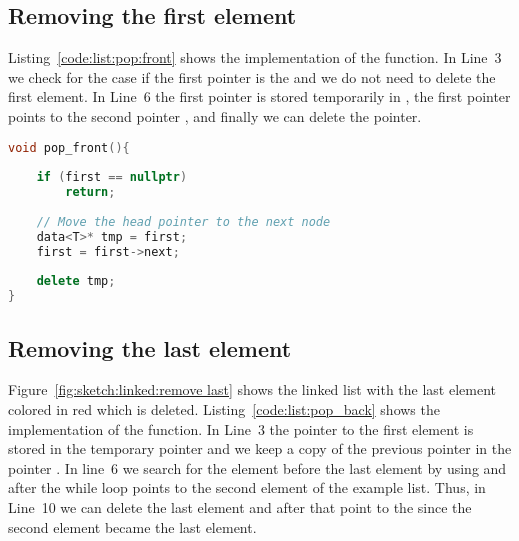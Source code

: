 \subsection*{Removing the first element}


Listing~\ref{code:list:pop:front} shows the implementation of the  function. In Line~3 we check for the case if the first pointer is the  and we do not need to delete the first element. In Line~6 the first pointer is stored temporarily in , the first pointer points to the second pointer , and finally we can delete the  pointer.


\begin{lstlisting}[language=c++,caption={Implementation of the \cpp{pop_front} function of a linked list.\label{code:list:pop:front}},float,floatplacement=tb]
void pop_front(){
    
    if (first == nullptr) 
        return; 
  
    // Move the head pointer to the next node 
    data<T>* tmp = first; 
    first = first->next; 
  
    delete tmp;   
}
\end{lstlisting}


\subsection*{Removing the last element}
Figure~\ref{fig:sketch:linked:remove last} shows the linked list with the last element colored in \textcolor{amaranth}{red} which is deleted. Listing~\ref{code:list:pop_back} shows the implementation of the  function. In Line~3 the pointer to the first element is stored in the temporary pointer  and we keep a copy of the previous pointer in the pointer . In line~6 we search for the element before the last element by using  and after the while loop  points to the second element of the example list.  Thus, in Line~10 we can delete the last element  and after that point to the  since the second element became the last element.


